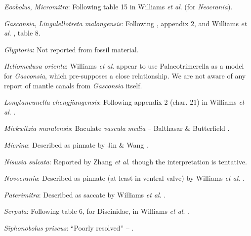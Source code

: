 \documentclass[openany]{book}
\theoremstyle{definition}
\theoremstyle{definition}
\theoremstyle{definition}
\theoremstyle{remark}
\begin{document}
\hypertarget{Eoobolus-coding-31}{}
\emph{Eoobolus}, \emph{Micromitra}: Following table 15 in Williams
\emph{et al}. \citeyearpar{Williams2000LinguliformeaCraniiformea} (for
\emph{Neocrania}).

\hypertarget{Gasconsia-coding-31}{}
\emph{Gasconsia}, \emph{Lingulellotreta malongensis}: Following
\citet{Williams1998Thediversity}, appendix 2, and Williams \emph{et al}.
\citeyearpar{Williams2000LinguliformeaCraniiformea}, table 8.

\hypertarget{Glyptoria-coding-31}{}
\emph{Glyptoria}: Not reported from fossil material.

\hypertarget{Heliomedusa_orienta-coding-31}{}
\emph{Heliomedusa orienta}: Williams \emph{et al}. \citeyearpar[table
15]{Williams2000LinguliformeaCraniiformea} appear to use
Palaeotrimerella \citep[as drawn in][]{Williams1997Introduction} as a
model for \emph{Gasconsia}, which pre-supposes a close relationship. We
are not aware of any report of mantle canals from \emph{Gasconsia}
itself.

\hypertarget{Longtancunella_chengjiangensis-coding-31}{}
\emph{Longtancunella chengjiangensis}: Following appendix 2 (char. 21)
in Williams \emph{et al}. \citeyearpar{Williams1998Thediversity}.

\hypertarget{Mickwitzia_muralensis-coding-31}{}
\emph{Mickwitzia muralensis}: Baculate \emph{vascula} \emph{media} --
Balthasar \& Butterfield \citeyearpar{Balthasar2009EarlyCambrian}.

\hypertarget{Micrina-coding-31}{}
\emph{Micrina}: Described as pinnate by Jin \& Wang
\citeyearpar{Jin1992Revisionof}.

\hypertarget{Nisusia_sulcata-coding-31}{}
\emph{Nisusia sulcata}: Reported by Zhang \emph{et al}.
\citeyearpar[2011T]{Zhang2007Agregarious} though the interpretation is
tentative.

\hypertarget{Novocrania-coding-31}{}
\emph{Novocrania}: Described as pinnate (at least in ventral valve) by
Williams \emph{et al}. \citeyearpar[p.~250]{Williams1998Thediversity}.

\hypertarget{Paterimitra-coding-31}{}
\emph{Paterimitra}: Described as saccate by Williams \emph{et al}.
\citeyearpar{Williams1998Thediversity}.

\hypertarget{Serpula-coding-31}{}
\emph{Serpula}: Following table 6, for Discinidae, in Williams \emph{et
al}. \citeyearpar{Williams2000LinguliformeaCraniiformea}.

\hypertarget{Siphonobolus_priscus-coding-31}{}
\emph{Siphonobolus priscus}: ``Poorly resolved'' --
\citet{Balthasar2008iMummpikia}.
\end{document}
